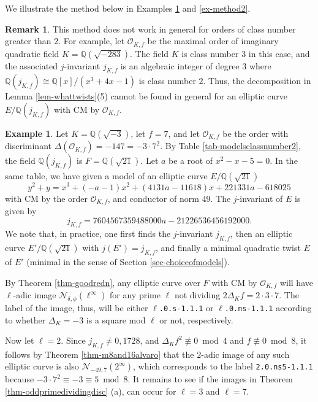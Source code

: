 \documentclass[11pt]{amsart}
\theoremstyle{definition}
\newtheorem{remark}[defn]{Remark}
\newtheorem{example}[defn]{Example}
\newcommand{\Q}{\mathbb Q}
\newcommand{\Of}{\mathcal{O}_{K,f}}
\begin{document}
We illustrate the method below in Examples \ref{ex-method1} and \ref{ex-method2}.

\begin{remark}\label{rem-classnumber3}
    This method does not work in general for orders of class number greater than $2$. For example, let $\Of$ be the maximal order of imaginary quadratic field $K = \Q(\sqrt{-283})$. The field $K$ is class number $3$ in this case, and the associated $j$-invariant $j_{K,f}$ is an algebraic integer of degree $3$ where $\Q(j_{K,f}) \cong \Q[x]/(x^3 + 4x - 1)$ is class number $2$. Thus, the decomposition in Lemma \ref{lem-whattwists}(5) cannot be found in general for an elliptic curve $E/\Q(j_{K,f})$ with CM by $\Of$.
\end{remark}

\begin{example}\label{ex-method1}
    Let $K=\Q(\sqrt{-3})$, let $f=7$, and let $\Of$ be the order with discriminant $\Delta(\Of)=-147=-3\cdot 7^2$. By Table \ref{tab-modelsclassnumber2}, the field $\Q(j_{K,f})$ is $F=\Q(\sqrt{21})$. Let $a$ be a root of $x^2-x-5=0$. In the same table, we have given a model of an elliptic curve $E/\Q(\sqrt{21})$   
    $$y^2 + y = x^3 + (-a - 1)x^2 + (4131a - 11618)x + 221331a - 618025$$
    with CM by the order $\Of$, and conductor of norm $49$. The $j$-invariant of $E$ is given by
    $$j_{K,f} = 7604567359488000a - 21226536456192000.$$
    We note that, in practice, one first finds the $j$-invariant $j_{K,f}$, then an elliptic curve $E'/\Q(\sqrt{21})$ with $j(E')=j_{K,f}$, and finally a minimal quadratic twist $E$ of $E'$ (minimal in the sense of Section \ref{sec-choiceofmodels}). 

By Theorem \ref{thm-goodredn}, any elliptic curve over $F$ with CM by $\Of$ will have $\ell$-adic image $\mathcal{N}_{\delta,\phi}(\ell^\infty)$ for any prime $\ell$ not dividing $2\Delta_K f = 2\cdot 3\cdot 7$. The label of the image, thus, will be either \texttt{$\ell$.0.s-1.1.1} or \texttt{$\ell$.0.ns-1.1.1} according to whether $\Delta_K=-3$ is a square mod $\ell$ or not, respectively. 


Now let $\ell=2$. Since $j_{K,f}\neq 0,1728$, and $\Delta_K f^2 \not\equiv 0 \bmod 4$ and $f\not\equiv 0\bmod 8$, it follows by Theorem \ref{thm-m8and16alvaro} that the $2$-adic image of any such elliptic curve is also $\mathcal{N}_{-49,7}(2^\infty)$, which corresponds to the label \texttt{2.0.ns5-1.1.1} because $-3\cdot 7^2\equiv -3\equiv 5 \bmod 8$. It remains to see if the images in Theorem \ref{thm-oddprimedividingdisc} (a), can occur for $\ell=3$ and $\ell=7$.
    

\end{example}
\end{document}
